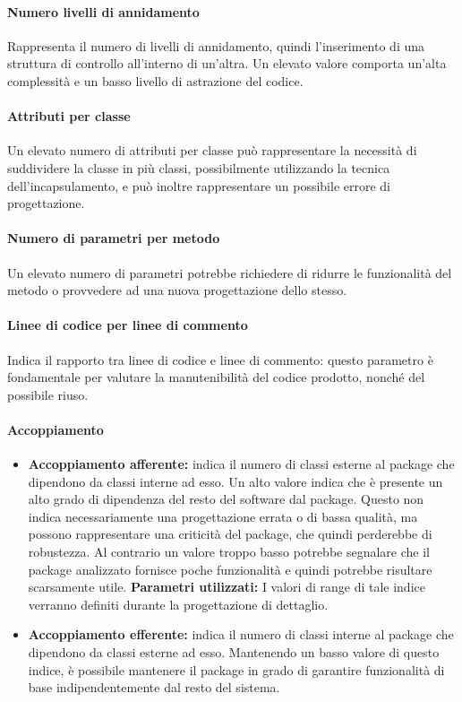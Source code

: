 \paragraph{Numero livelli di annidamento}
Rappresenta il numero di livelli di annidamento, quindi l'inserimento di una struttura di controllo all'interno di un'altra. Un elevato valore comporta un'alta complessità e un basso livello di astrazione del codice.\\

\paragraph{Attributi per classe}
Un elevato numero di attributi per classe può rappresentare la necessità di suddividere la classe in più classi, possibilmente utilizzando la tecnica dell'incapsulamento, e può inoltre rappresentare un possibile errore di progettazione.\\

\paragraph{Numero di parametri per metodo}
Un elevato numero di parametri potrebbe richiedere di ridurre le funzionalità del metodo o provvedere ad una nuova progettazione dello stesso.\\

\paragraph{Linee di codice per linee di commento}
Indica il rapporto tra linee di codice e linee di commento: questo parametro è fondamentale per valutare la manutenibilità del codice prodotto, nonché del possibile riuso.\\

\paragraph{Accoppiamento}
\begin{itemize}
\item \textbf{Accoppiamento afferente:} indica il numero di classi esterne al package che dipendono da classi interne ad esso. Un alto valore indica che è presente un alto grado di dipendenza del resto del software dal package. Questo non indica necessariamente una progettazione errata o di bassa qualità, ma possono rappresentare una criticità del package, che quindi perderebbe di robustezza. Al contrario un valore troppo basso potrebbe segnalare che il package analizzato fornisce poche funzionalità e quindi potrebbe risultare scarsamente utile.
\textbf{Parametri utilizzati:}
I valori di range di tale indice verranno definiti durante la progettazione di dettaglio.
\item \textbf{Accoppiamento efferente:} indica il numero di classi interne al package che dipendono da classi esterne ad esso. Mantenendo un basso valore di questo indice, è possibile mantenere il package in grado di garantire funzionalità di base indipendentemente dal resto del sistema.
\end{itemize}
